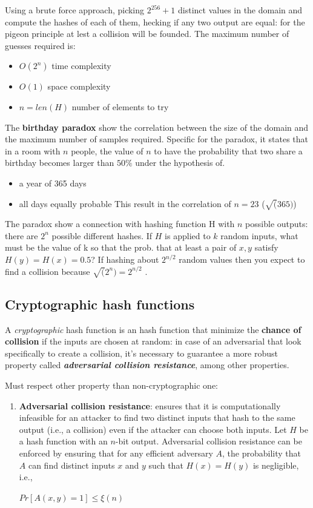 \documentclass[10pt,a4paper]{report}
\begin{document}
Using a brute force approach, picking $2^{256} + 1$ distinct values in the domain and compute the hashes of each of them, hecking if any two output are equal: for the pigeon principle at lest a collision will be founded.
The maximum number of guesses required is:
\begin{itemize}
	\item 
	$O(2^{n})$ time complexity
	\item 
	$O(1)$ space complexity
	\item 
	$n = len(H)$ number of elements to try
\end{itemize}

The \textbf{birthday paradox} show the correlation between the size of the domain and the maximum number of samples required. Specific for the paradox, it states that in a room with $n$ people, the value of $n$ to have the probability that two share a birthday becomes larger than $50\%$ under the hypothesis of.
\begin{itemize}
	\item 
	a year of 365 days
	\item 
	all days equally probable
	This result in the correlation of $n = 23$ ($\sqrt(365)$)
\end{itemize}

The paradox show a connection with hashing function H with $n$ possible outputs: there are $2^{n}$ possible different hashes.
If $H$ is applied to $k$ random inputs, what must be the value of k so that the prob. that at least a pair of $x,y$ satisfy $H(y) = H(x) = 0.5$?
If hashing about $2^{n/2}$ random values then you expect to find a collision because $\sqrt(2^{n}) = 2^{n/2}$ .
\subsection{Cryptographic hash functions}\label{sec:cryptographic-hash-functions}

A \textit{cryptographic} hash function is an hash function that minimize the \textbf{chance of collision} if the inputs are chosen at random: in case of an adversarial that look specifically to create a collision, it's necessary to guarantee a more robust property called \textit{\textbf{adversarial collision resistance}}, among other properties.

Must respect other property than non-cryptographic one:
\begin{enumerate}
	\item 
	\textbf{Adversarial collision resistance}: ensures that it is computationally infeasible for an attacker to find two distinct inputs that hash to the same output (i.e., a collision) even if the attacker can choose both inputs.
	Let $H$ be a hash function with an $n$-bit output. Adversarial collision resistance can be enforced by ensuring that for any efficient adversary $A$, the probability that $A$ can find distinct inputs $x$ and $y$ such that $H(x) = H(y)$ is negligible, i.e.,

	\begin{center}
		$Pr[A(x,y) = 1] \leq \xi(n)$
	\end{center}
\end{enumerate}
\end{document}
